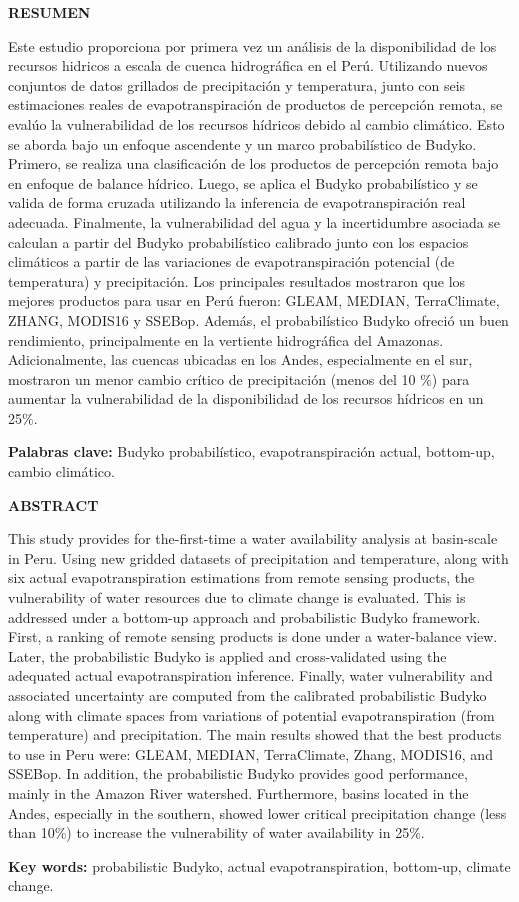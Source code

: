 \begin{center}
\large{\textbf {RESUMEN}}
\end{center}

Este estudio proporciona por primera vez un análisis de la disponibilidad de los recursos hidricos a escala de cuenca hidrográfica en el Perú. Utilizando nuevos conjuntos de datos grillados de precipitación y temperatura, junto con seis estimaciones reales de evapotranspiración de productos de percepción remota, se evalúo la vulnerabilidad de los recursos hídricos debido al cambio climático. Esto se aborda bajo un enfoque ascendente y un marco probabilístico de Budyko. Primero, se realiza una clasificación de los productos de percepción remota bajo en enfoque de balance hídrico. Luego, se aplica el Budyko probabilístico y se valida de forma cruzada utilizando la inferencia de evapotranspiración real adecuada. Finalmente, la vulnerabilidad del agua y la incertidumbre asociada se calculan a partir del Budyko probabilístico calibrado junto con los espacios climáticos a partir de las variaciones de evapotranspiración potencial (de temperatura) y precipitación. Los principales resultados mostraron que los mejores productos para usar en Perú fueron: GLEAM, MEDIAN, TerraClimate, ZHANG, MODIS16 y SSEBop. Además, el probabilístico Budyko ofreció un buen rendimiento, principalmente en la vertiente hidrográfica del Amazonas. Adicionalmente, las cuencas ubicadas en los Andes, especialmente en el sur, mostraron un menor cambio crítico de precipitación (menos del 10 \%) para aumentar la vulnerabilidad de la disponibilidad de los recursos hídricos en un 25\%.

\textbf {Palabras clave:} Budyko probabilístico, evapotranspiración actual, bottom-up, cambio climático.

\clearpage

\begin{center}
\large{\textbf {ABSTRACT}}
\end{center}

This study provides for the-first-time a water availability analysis at basin-scale in Peru. Using new gridded datasets of precipitation and temperature, along with six actual evapotranspiration estimations from remote sensing products, the vulnerability of water resources due to climate change is evaluated. This is addressed under a bottom-up approach and probabilistic Budyko framework. First, a ranking of remote sensing products is done under a water-balance view. Later, the probabilistic Budyko is applied and cross-validated using the adequated actual evapotranspiration inference. Finally, water vulnerability and associated uncertainty are computed from the calibrated probabilistic Budyko along with climate spaces from variations of potential evapotranspiration (from temperature) and precipitation. The main results showed that the best products to use in Peru were: GLEAM, MEDIAN, TerraClimate, Zhang, MODIS16, and SSEBop. In addition, the probabilistic Budyko provides good performance, mainly in the Amazon River watershed. Furthermore, basins located in the Andes, especially in the southern, showed lower critical precipitation change (less than 10\%) to increase the vulnerability of water availability in 25\%.

\textbf {Key words:} probabilistic Budyko, actual evapotranspiration, bottom-up, climate change.

\clearpage